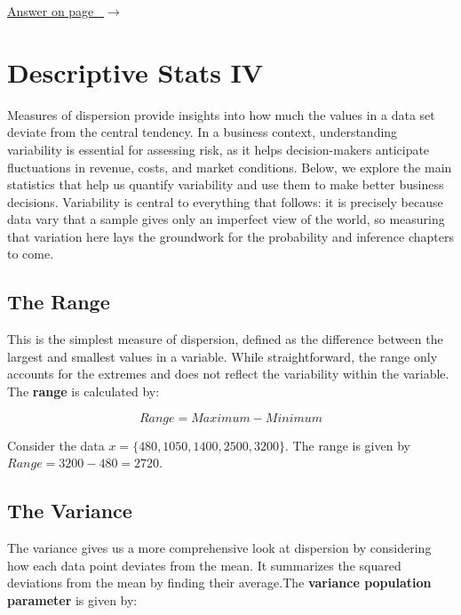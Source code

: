 \documentclass[
  11pt,
  letterpaper,
  DIV=11,
  numbers=noendperiod,
  oneside,
  open=any]{scrreprt}
\newcommand{\bsanswerref}[1]{%
  \par\nopagebreak\hypertarget{q-#1}{}\label{q-#1}%
  {\raggedleft\sffamily\footnotesize\hyperlink{a-#1}{\textcolor{bsaccent}{Answer on page \pageref{a-#1}\ $\rightarrow$}}\par}%
  \medskip}
\begin{document}
\bsanswerref{bsans30}

\chapter{Descriptive Stats IV}\label{descriptive-stats-iv}

Measures of dispersion provide insights into how much the values in a
data set deviate from the central tendency. In a business context,
understanding variability is essential for assessing risk, as it helps
decision-makers anticipate fluctuations in revenue, costs, and market
conditions. Below, we explore the main statistics that help us quantify
variability and use them to make better business decisions. Variability
is central to everything that follows: it is precisely because data vary
that a sample gives only an imperfect view of the world, so measuring
that variation here lays the groundwork for the probability and
inference chapters to come.

\section{The Range}\label{the-range}

This is the simplest measure of dispersion, defined as the difference
between the largest and smallest values in a variable. While
straightforward, the range only accounts for the extremes and does not
reflect the variability within the variable. The \textbf{range} is
calculated by:

\begin{bsformula}

\[Range=Maximum-Minimum\]

\end{bsformula}

\begin{bsexample}[Example]

Consider the data \(x=\{480, 1050, 1400, 2500, 3200\}\). The range is
given by \(Range=3200-480=2720\).

\end{bsexample}

\section{The Variance}\label{the-variance}

The variance gives us a more comprehensive look at dispersion by
considering how each data point deviates from the mean. It summarizes
the squared deviations from the mean by finding their average.The
\textbf{variance population parameter} is given by:
\end{document}
